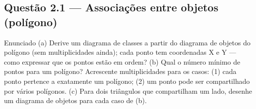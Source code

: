\documentclass[11pt,a4paper]{article}
\begin{document}
\subsection*{Questão 2.1 — Associações entre objetos (polígono)}
\begin{questao}{Enunciado}
(a) Derive um diagrama de classes a partir do diagrama de objetos do polígono
(sem multiplicidades ainda); cada ponto tem coordenadas X e Y — como expressar
que os pontos estão em ordem? (b) Qual o número mínimo de pontos para um
polígono? Acrescente multiplicidades para os casos: (1) cada ponto pertence a
exatamente um polígono; (2) um ponto pode ser compartilhado por vários polígonos.
(c) Para dois triângulos que compartilham um lado, desenhe um diagrama de objetos
para cada caso de (b).
\end{questao}
\end{document}
